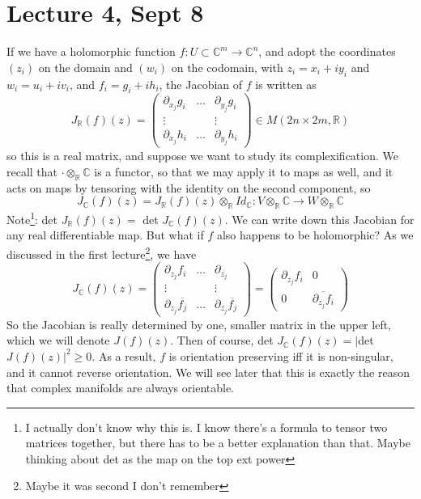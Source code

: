 \documentclass[12pt]{report}
\theoremstyle{definition}
\theoremstyle{remark}
\numberwithin{equation}{section}
\theoremstyle{definition}
\newcommand{\bb}[1]{\mathbb{#1}}
\begin{document}
\section*{Lecture 4, Sept 8}
\label{sec:4}
If we have a holomorphic function $f: U \subset \bb C^m \to \bb C^n$, and adopt the coordinates $(z_i)$ on the domain and $(w_i)$ on the codomain, with $z_i = x_i + iy_i$ and $w_i = u_i + iv_i$, and $f_i = g_i + ih_i$, the Jacobian of $f$ is written as 
$$
	J_ \bb R(f)(z) = \begin{pmatrix}	\partial_{x_j} g_i & \dots & \partial_{y_j} g_i \\ \vdots & & \vdots \\ \partial _{x_j}h_i & \dots & \partial_{y_j} h_i\end{pmatrix} \in M(2n \times 2m, \bb R)
$$
so this is a real matrix, and suppose we want to study its complexification. We recall that $\cdot \otimes_\bb R \bb C$ is a functor, so that we may apply it to maps as well, and it acts on maps by tensoring with the identity on the second component, so 
$$
	J_\bb C(f)(z) = J_\bb R(f)(z) \otimes_\bb R Id_\bb C : V \otimes_\bb R \bb C \to W \otimes_\bb R \bb C
$$
Note\footnote{I actually don't know why this is. I know there's a formula to tensor two matrices together, but there has to be a better explanation than that. Maybe thinking about det as the map on the top ext power}: det $J_\bb R(f)(z) = $ det $J_\bb C(f)(z)$. We can write down this Jacobian for any real differentiable map. But what if $f$ also happens to be holomorphic? As we discussed in the first lecture\footnote{Maybe it was second I don't remember}, we have 
$$
	J_\bb C(f)(z) = \begin{pmatrix}\partial_{z_j} f_i & \dots & \partial_{\overline{z_j}}\\ \vdots & & \vdots \\ \partial_{z_j} \overline{f_j} & \dots & \partial_{\overline{z_j}} \overline{f_j} \end{pmatrix} = \begin{pmatrix}\partial_{z_j} f_i & 0 \\ 0 & \overline{\partial_{z_j} f_i} \end{pmatrix}
$$
So the Jacobian is really determined by one, smaller matrix in the upper left, which we will denote $J(f)(z)$. Then of course, det $J_\bb C(f)(z) = |$det $J(f)(z)|^2 \geq 0$. As a result, $f$ is orientation preserving iff it is non-singular, and it cannot reverse orientation. We will see later that this is exactly the reason that complex manifolds are always orientable. \\
\end{document}
